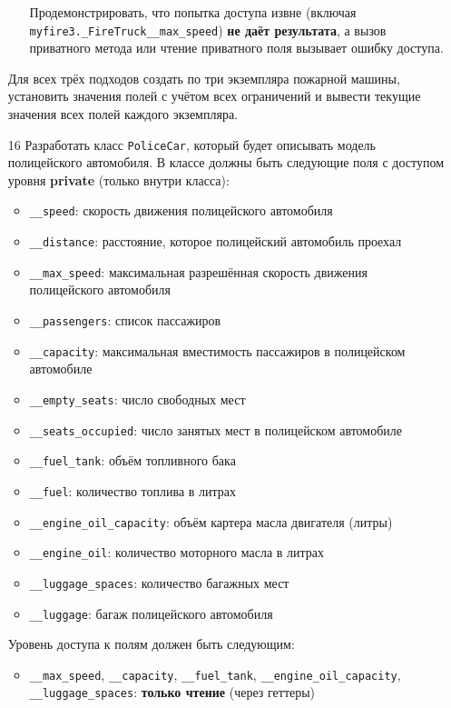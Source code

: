 \begin{enumerate}
\begin{enumerate}
    Продемонстрировать, что попытка доступа извне (включая \texttt{myfire3.\_FireTruck\_\_max\_speed}) \textbf{не даёт результата}, а вызов приватного метода или чтение приватного поля вызывает ошибку доступа.
\end{enumerate}
Для всех трёх подходов создать по три экземпляра пожарной машины, установить значения полей с учётом всех ограничений и вывести текущие значения всех полей каждого экземпляра.
\item[16] Разработать класс \texttt{PoliceCar}, который будет описывать модель полицейского автомобиля. В классе должны быть следующие поля с доступом уровня \textbf{private} (только внутри класса):
\begin{itemize}
    \item \texttt{\_\_speed}: скорость движения полицейского автомобиля  
    \item \texttt{\_\_distance}: расстояние, которое полицейский автомобиль проехал  
    \item \texttt{\_\_max\_speed}: максимальная разрешённая скорость движения полицейского автомобиля  
    \item \texttt{\_\_passengers}: список пассажиров  
    \item \texttt{\_\_capacity}: максимальная вместимость пассажиров в полицейском автомобиле  
    \item \texttt{\_\_empty\_seats}: число свободных мест  
    \item \texttt{\_\_seats\_occupied}: число занятых мест в полицейском автомобиле  
    \item \texttt{\_\_fuel\_tank}: объём топливного бака  
    \item \texttt{\_\_fuel}: количество топлива в литрах  
    \item \texttt{\_\_engine\_oil\_capacity}: объём картера масла двигателя (литры)  
    \item \texttt{\_\_engine\_oil}: количество моторного масла в литрах  
    \item \texttt{\_\_luggage\_spaces}: количество багажных мест  
    \item \texttt{\_\_luggage}: багаж полицейского автомобиля  
\end{itemize}
Уровень доступа к полям должен быть следующим:
\begin{itemize}
    \item \texttt{\_\_max\_speed}, \texttt{\_\_capacity}, \texttt{\_\_fuel\_tank}, \texttt{\_\_engine\_oil\_capacity}, \texttt{\_\_luggage\_spaces}: \textbf{только чтение} (через геттеры)  

\end{itemize}
\end{enumerate}
